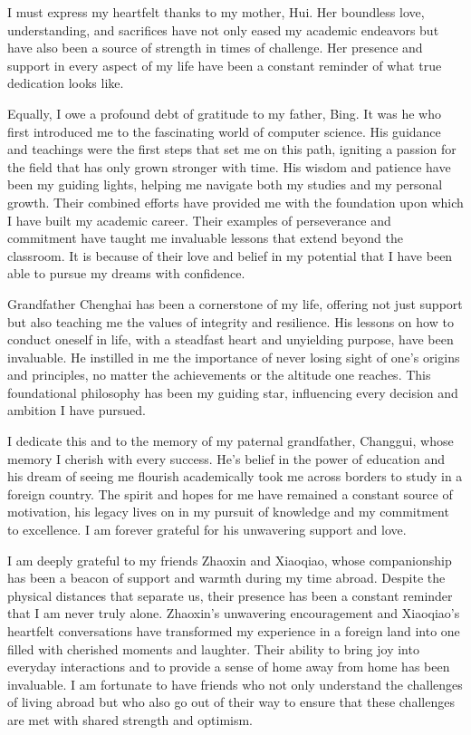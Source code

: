 \documentclass[twocolumn]{article}
\begin{document}
        I must express my heartfelt thanks to my mother, Hui. Her boundless love, understanding, and sacrifices have not only eased my academic endeavors but have also been a source of strength in times of challenge. Her presence and support in every aspect of my life have been a constant reminder of what true dedication looks like.
        
        Equally, I owe a profound debt of gratitude to my father, Bing. It was he who first introduced me to the fascinating world of computer science. His guidance and teachings were the first steps that set me on this path, igniting a passion for the field that has only grown stronger with time. His wisdom and patience have been my guiding lights, helping me navigate both my studies and my personal growth. Their combined efforts have provided me with the foundation upon which I have built my academic career. Their examples of perseverance and commitment have taught me invaluable lessons that extend beyond the classroom. It is because of their love and belief in my potential that I have been able to pursue my dreams with confidence.

        Grandfather Chenghai has been a cornerstone of my life, offering not just support but also teaching me the values of integrity and resilience. His lessons on how to conduct oneself in life, with a steadfast heart and unyielding purpose, have been invaluable. He instilled in me the importance of never losing sight of one's origins and principles, no matter the achievements or the altitude one reaches. This foundational philosophy has been my guiding star, influencing every decision and ambition I have pursued.

        I dedicate this and to the memory of my paternal grandfather, Changgui, whose memory I cherish with every success. He's belief in the power of education and his dream of seeing me flourish academically took me across borders to study in a foreign country. The spirit and hopes for me have remained a constant source of motivation, his legacy lives on in my pursuit of knowledge and my commitment to excellence. I am forever grateful for his unwavering support and love. 

        I am deeply grateful to my friends Zhaoxin and Xiaoqiao, whose companionship has been a beacon of support and warmth during my time abroad. Despite the physical distances that separate us, their presence has been a constant reminder that I am never truly alone. Zhaoxin's unwavering encouragement and Xiaoqiao's heartfelt conversations have transformed my experience in a foreign land into one filled with cherished moments and laughter. Their ability to bring joy into everyday interactions and to provide a sense of home away from home has been invaluable. I am fortunate to have friends who not only understand the challenges of living abroad but who also go out of their way to ensure that these challenges are met with shared strength and optimism.
        
\end{document}

